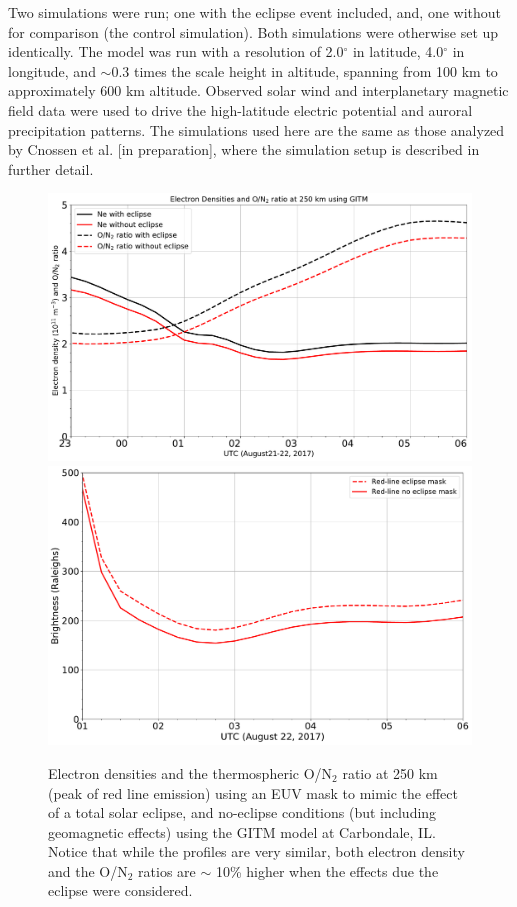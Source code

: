 \documentclass[crop=false,class=mitthesis,oneside,font=12pt]{standalone}
\begin{document}
%
Two simulations were run; one with the eclipse event included, and, one without for comparison (the control simulation). Both simulations were otherwise set up identically. The model was run with a resolution of 2.0$^\circ$ in latitude, 4.0$^\circ$ in longitude, and $\sim$0.3 times the scale height in altitude, spanning from 100 km to approximately 600 km altitude. Observed solar wind and interplanetary magnetic field data were used to drive the high-latitude electric potential and auroral precipitation patterns. The simulations used here are the same as those analyzed by Cnossen et al. [in preparation], where the simulation setup is described in further detail. 
   \begin{figure}[H]
 \centering\includegraphics[width=35pc]{ec_vs_nec_tid.pdf}
 \centering\includegraphics[width=30pc]{GITM_with_GLOW_dglow.pdf}
 \caption{ Electron densities  and the thermospheric O/N$_2$ ratio at 250 km (peak of red line emission) using an EUV mask to mimic the effect of a total solar eclipse, and no-eclipse conditions (but including geomagnetic effects) using the GITM model at Carbondale, IL. Notice that while the profiles are very similar, both electron density and the O/N$_2$ ratios are $\sim$ 10\% higher when the effects due the eclipse were considered. }
 \label{fig:ec_ne}
 \end{figure}
 
\end{document}
